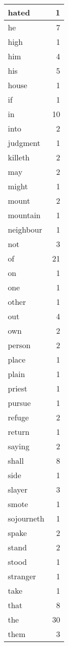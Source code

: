 \begin{center}
\begin{longtable}{l|r}
hated & 1\\ \hline 
he & 7\\ \hline 
high & 1\\ \hline 
him & 4\\ \hline 
his & 5\\ \hline 
house & 1\\ \hline 
if & 1\\ \hline 
in & 10\\ \hline 
into & 2\\ \hline 
judgment & 1\\ \hline 
killeth & 2\\ \hline 
may & 2\\ \hline 
might & 1\\ \hline 
mount & 2\\ \hline 
mountain & 1\\ \hline 
neighbour & 1\\ \hline 
not & 3\\ \hline 
of & 21\\ \hline 
on & 1\\ \hline 
one & 1\\ \hline 
other & 1\\ \hline 
out & 4\\ \hline 
own & 2\\ \hline 
person & 2\\ \hline 
place & 1\\ \hline 
plain & 1\\ \hline 
priest & 1\\ \hline 
pursue & 1\\ \hline 
refuge & 2\\ \hline 
return & 1\\ \hline 
saying & 2\\ \hline 
shall & 8\\ \hline 
side & 1\\ \hline 
slayer & 3\\ \hline 
smote & 1\\ \hline 
sojourneth & 1\\ \hline 
spake & 2\\ \hline 
stand & 2\\ \hline 
stood & 1\\ \hline 
stranger & 1\\ \hline 
take & 1\\ \hline 
that & 8\\ \hline 
the & 30\\ \hline 
them & 3\\ \hline 

\end{longtable}
\end{center}
